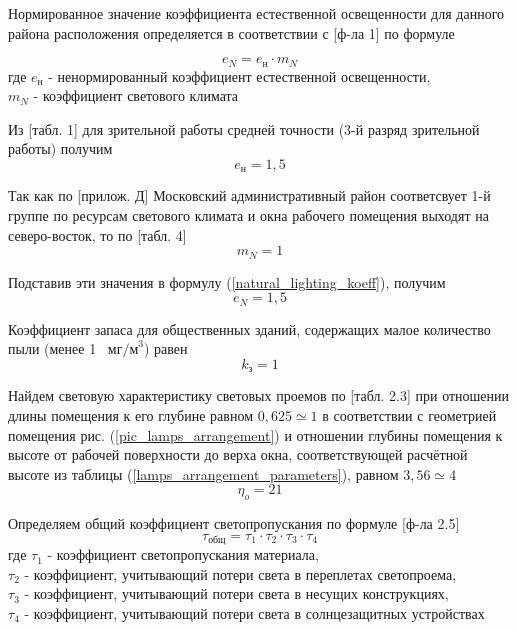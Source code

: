 Нормированное значение коэффициента естественной освещенности для данного
района расположения определяется в соответствии с \cite{ecology_snip_23_05_95}[ф-ла 1]
по формуле

\begin{equation}
    e_N = e_\text{н} \cdot m_N
    \label{natural_lighting_koeff}
\end{equation}
где $e_\text{н}$ - ненормированный коэффициент естественной освещенности, \\
$m_N$ - коэффициент светового климата

Из \cite{ecology_snip_23_05_95}[табл. 1] для зрительной работы средней точности
(3-й разряд зрительной работы) получим
$$
    e_\text{н} = 1,5
$$

Так как по \cite{ecology_snip_23_05_95}[прилож. Д] Московский административный
район соответсвует 1-й группе по ресурсам светового климата и окна рабочего
помещения выходят на северо-восток, то по \cite{ecology_snip_23_05_95}[табл. 4]
$$
    m_N = 1
$$

Подставив эти значения в формулу (\ref{natural_lighting_koeff}), получим
$$
    e_N = 1,5
$$

Коэффициент запаса для общественных зданий, содержащих малое количество пыли
(менее 1 ~$\text{мг/м}^3$) равен
$$
    k_\text{з} = 1
$$

Найдем световую характеристику световых проемов по
\cite{lighting_calc_method}[табл. 2.3] при отношении длины помещения к его глубине
равном $0,625 \simeq 1$ в соответствии с геометрией помещения рис. (\ref{pic_lamps_arrangement})
и отношении глубины помещения к высоте от рабочей поверхности до верха окна,
соответствующей расчётной высоте из таблицы (\ref{lamps_arrangement_parameters}),
равном $3,56 \simeq 4$
$$
    \eta_o = 21
$$

Определяем общий коэффициент светопропускания по формуле
\cite{lighting_calc_method}[ф-ла 2.5]
\begin{equation}
    \tau_\text{общ} = \tau_1 \cdot \tau_2 \cdot \tau_3 \cdot \tau_4
    \label{overall_light_pass_koeff}
\end{equation}
где $\tau_1$ - коэффициент светопропускания материала,                          \\
$\tau_2$ - коэффициент, учитывающий потери света в переплетах светопроема,      \\
$\tau_3$ - коэффициент, учитывающий потери света в несущих конструкциях,        \\
$\tau_4$ - коэффициент, учитывающий потери света в солнцезащитных устройствах

